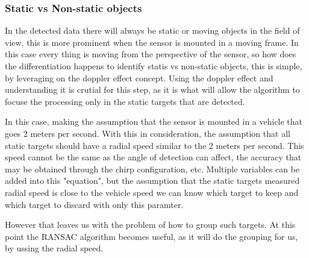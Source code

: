 \subsubsection*{Static vs Non-static objects}
In the detected data there will always be static or moving objects in the field of view, this is more prominent when the sensor is mounted in a moving frame.
In this case every thing is moving from the perspective of the sensor, so how does the differentiation happens to identify statis vs non-static objects, this is simple, by leveraging on the doppler effect concept.
Using the doppler effect and understanding it is crutial for this step, as it is what will allow the algorithm to focuse the processing only in the static targets that are detected.

In this case, making the assumption that the sensor is mounted in a vehicle that goes 2 meters per second. With this in consideration, the assumption that all static targets should have a radial speed similar to the 2 meters per second.
This speed cannot be the same as the angle of detection can affect, the accuracy that may be obtained through the chirp configuration, etc.
Multiple variables can be added into this "equation", but the assumption that the static targets measured radial speed is close to the vehicle speed we can know which target to keep and which target to discard with only this paramter.

However that leaves us with the problem of how to group such targets. At this point the RANSAC algorithm becomes useful, as it will do the grouping for us, by ussing the radial speed.
